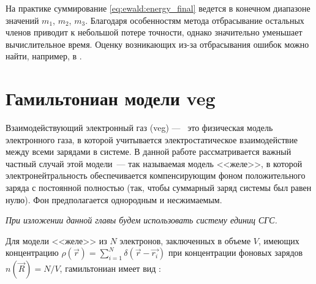 На практике суммирование \eqref{eq:ewald:energy_final} ведется в конечном диапазоне значений $m_1$, $m_2$, $m_3$.
Благодаря особенностям метода отбрасывание остальных членов приводит к небольшой потере точности, однако значительно уменьшает вычислительное время.
Оценку возникающих из-за отбрасывания ошибок можно найти, например, в \cite{ewald:errors_study}.

\section{Гамильтониан модели \texorpdfstring{\acrshort{veg}}{ВЭГ}}
Взаимодействующий электронный газ (\acrshort{veg}) ---~ это физическая модель электронного газа, в которой учитывается электростатическое взаимодействие между всеми зарядами в системе.
В данной работе рассматривается важный частный случай этой модели~--- так называемая модель <<желе>>, в которой электронейтральность обеспечивается компенсирующим фоном положительного заряда с постоянной полностью (так, чтобы суммарный заряд системы был равен нулю). Фон предполагается однородным и несжимаемым.

\textit{При изложении данной главы будем использовать систему единиц СГС.}

Для модели <<желе>> из $N$ электронов, заключенных в объеме $V$, имеющих концентрацию $\rho (\vec{r}) = \sum_{i=1}^{N} \delta(\vec{r}-\vec{r_i})$ при концентрации фоновых зарядов $n(\vec{R}) = N/V$, гамильтониан имеет вид \cite{jel:mahan_hamiltonian}:

